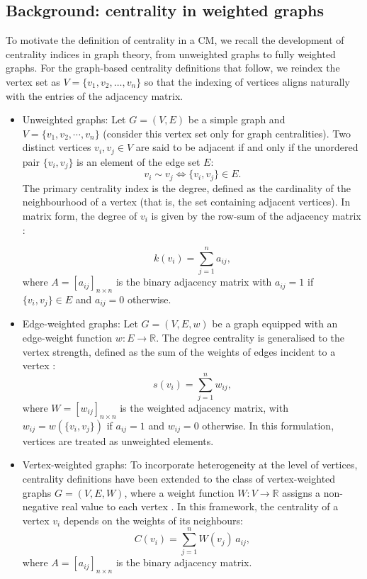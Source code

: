 \documentclass[12pt]{article}
\theoremstyle{normalhead_nobrackets}
\theoremstyle{exampstyle}
\begin{document}
\subsection{Background: centrality in weighted graphs}

To motivate the definition of centrality in a CM, we recall the development of centrality indices in graph theory, from unweighted graphs to fully weighted graphs.
For the graph-based centrality definitions that follow, 
we reindex the vertex set as 
$V = \{v_1, v_2, \ldots, v_n\}$ 
so that the indexing of vertices aligns naturally with the 
entries of the adjacency matrix.

\begin{itemize}
\item[{(a)}]{ Unweighted graphs:}
Let $G = (V, E)$ be a simple graph and $V=\{v_1,v_2,\cdots,v_n\}$ (consider this vertex set only for graph centralities). Two distinct vertices $v_i, v_j \in V$ are said to be adjacent if and only if the unordered pair $\{v_i, v_j\}$ is an element of the edge set $E$:
\[
v_i \sim v_j \iff \{v_i, v_j\} \in E.
\]
The primary centrality index is the {degree}, defined as the cardinality of the neighbourhood of a vertex (that is, the set containing adjacent vertices). In matrix form, the degree of $v_i$ is given by the row-sum of the adjacency matrix \cite{estrada2015first}:

\begin{equation}\label{1eq:degre}
k(v_i) = \sum_{j=1}^n a_{ij},
\end{equation}
where $A = [a_{ij}]_{n \times n}$ is the binary adjacency matrix with $a_{ij} = 1$ if $\{v_i, v_j\} \in E$ and $a_{ij} = 0$ otherwise.

\item[(b)] {Edge-weighted graphs:}
Let $G = (V, E,w)$ be a graph equipped with an edge-weight function $w : E \to \mathbb{R}$. The degree centrality is generalised to the {vertex strength}, defined as the sum of the weights of edges incident to a vertex \cite{barrat2004architecture}:
\begin{equation}\label{1eq:weighted-degre}
s(v_i) = \sum_{j=1}^n w_{ij},
\end{equation}
where $W = [w_{ij}]_{n \times n}$ is the weighted adjacency matrix, with $w_{ij} = w(\{v_i, v_j\})$ if $a_{ij} = 1$ and $w_{ij} = 0$ otherwise. In this formulation, vertices are treated as unweighted elements.

\item[(c)] {Vertex-weighted graphs:}
To incorporate heterogeneity at the level of vertices, centrality definitions have been extended to the class of vertex-weighted graphs $G = (V, E, W)$, where a weight function $W : V \to \mathbb{R}$ assigns a non-negative real value to each vertex \cite{singh2020node}. In this framework, the centrality of a vertex $v_i$ depends on the weights of its neighbours:
\begin{equation}
C(v_i) = \sum_{j=1}^n W(v_j)\, a_{ij},
\end{equation}
where $A = [a_{ij}]_{n \times n}$ is the binary adjacency matrix.


\end{itemize}
\end{document}
